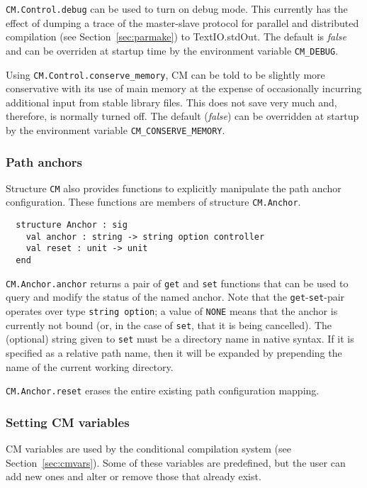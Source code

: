 \documentclass{article}
\begin{document}
{\tt CM.Control.debug} can be used to turn on debug mode.  This
currently has the effect of dumping a trace of the master-slave
protocol for parallel and distributed compilation (see
Section~\ref{sec:parmake}) to TextIO.stdOut. The default is {\em
false} and can be overriden at startup time by the environment
variable {\tt CM\_DEBUG}.

Using {\tt CM.Control.conserve\_memory}, CM can be told to be slightly
more conservative with its use of main memory at the expense of
occasionally incurring additional input from stable library files.
This does not save very much and, therefore, is normally turned off.
The default ({\em false}) can be overridden at startup by the
environment variable {\tt CM\_CONSERVE\_MEMORY}.

\subsubsection*{Path anchors}

Structure {\tt CM} also provides functions to explicitly manipulate
the path anchor configuration.  These functions are members of
structure {\tt CM.Anchor}.

\begin{verbatim}
  structure Anchor : sig
    val anchor : string -> string option controller
    val reset : unit -> unit
  end
\end{verbatim}

{\tt CM.Anchor.anchor} returns a pair of {\tt get} and {\tt set}
functions that can be used to query and modify the status of the named
anchor.  Note that the {\tt get}-{\tt set}-pair operates over type
{\tt string option}; a value of {\tt NONE} means that the anchor is
currently not bound (or, in the case of {\tt set}, that it is being
cancelled).  The (optional) string given to {\tt set} must be a
directory name in native syntax.  If it is specified as a relative
path name, then it will be expanded by prepending the name of the
current working directory.

{\tt CM.Anchor.reset} erases the entire existing path configuration
mapping.

\subsubsection*{Setting CM variables}

CM variables are used by the conditional compilation system (see
Section~\ref{sec:cmvars}).  Some of these variables are predefined,
but the user can add new ones and alter or remove those that already
exist.
\end{document}
